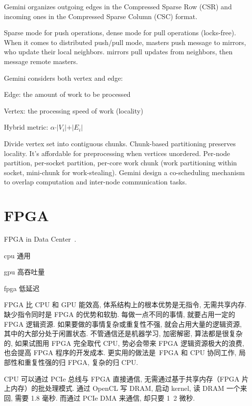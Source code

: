 \documentclass[UTF8,12pt,a4paper]{article}
\begin{document}
Gemini organizes outgoing edges in the Compressed Sparse Row (CSR)
and incoming ones in the Compressed Sparse Column (CSC) format.

Sparse mode for push operations, dense mode for pull operations (locks-free).
When it comes to distributed push/pull mode,
masters	push message to mirrors, who update	their	local	neighbors.
mirrors	pull updates from	neighbors, then	message	remote masters.

Gemini considers both	vertex and edge:
\begin{compactitem}
  \item Edge:	the	amount of	work to	be processed
  \item Vertex:	the	processing speed of	work (locality)
  \item Hybrid metric: $\alpha \cdot \vert V_i \vert + \vert E_i \vert$
\end{compactitem}

Divide vertex	set into contiguous chunks.
Chunk-based partitioning preserves locality.
It's affordable	for preprocessing	when vertices	unordered.
Per-node partition, per-socket partition, per-core work chunk
(work partitioning within socket, mini-chunk for work-stealing).
Gemini design a co-scheduling mechanism to
overlap computation and inter-node communication tasks.
\clearpage

\section{FPGA}
FPGA in Data Center~\cite{DBLP:conf/isca/PutnamCCCCDEFGGHHHHKLLPPSTXB14}.

\begin{compactitem}
  \item cpu 通用
  \item gpu 高吞吐量
  \item fpga 低延迟
\end{compactitem}

FPGA 比 CPU 和 GPU 能效高, 体系结构上的根本优势是无指令, 无需共享内存.
缺少指令同时是 FPGA 的优势和软肋. 每做一点不同的事情, 就要占用一定的 FPGA 逻辑资源.
如果要做的事情复杂或重复性不强, 就会占用大量的逻辑资源, 其中的大部分处于闲置状态.
不管通信还是机器学习, 加密解密, 算法都是很复杂的,
如果试图用 FPGA 完全取代 CPU, 势必会带来 FPGA 逻辑资源极大的浪费, 也会提高 FPGA 程序的开发成本.
更实用的做法是 FPGA 和 CPU 协同工作, 局部性和重复性强的归 FPGA, 复杂的归 CPU.

CPU 可以通过 PCIe 总线与 FPGA 直接通信, 无需通过基于共享内存（FPGA 片上内存）的批处理模式.
通过 OpenCL 写 DRAM, 启动 kernel, 读 DRAM 一个来回, 需要 1.8 毫秒.
而通过 PCIe DMA 来通信, 却只要 1~2 微秒.
\end{document}
